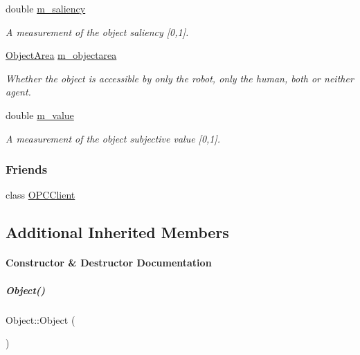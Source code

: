 \begin{DoxyCompactItemize}
double \hyperlink{group__icubclient__representations_a0d5e8b5dce9751c5439b50461a16782a}{m\+\_\+saliency}
\begin{DoxyCompactList}\small\item\em A measurement of the object saliency \mbox{[}0,1\mbox{]}. \end{DoxyCompactList}\item 
\hyperlink{namespaceicubclient_a582031d3e105cc59d614d15d30d22e65}{Object\+Area} \hyperlink{group__icubclient__representations_a762c490f385f69ba71c522d4eb9c1e9d}{m\+\_\+objectarea}
\begin{DoxyCompactList}\small\item\em Whether the object is accessible by only the robot, only the human, both or neither agent. \end{DoxyCompactList}\item 
double \hyperlink{group__icubclient__representations_a6d330b102ce154567c0532a345950f2a}{m\+\_\+value}
\begin{DoxyCompactList}\small\item\em A measurement of the object subjective value \mbox{[}0,1\mbox{]}. \end{DoxyCompactList}\end{DoxyCompactItemize}
\subsubsection*{Friends}
\begin{DoxyCompactItemize}
\item 
class \hyperlink{group__icubclient__representations_a80f0caa9925206967111a3d2713874a2}{O\+P\+C\+Client}
\end{DoxyCompactItemize}
\subsection*{Additional Inherited Members}


\paragraph{Constructor \& Destructor Documentation}
\mbox{\label{group__icubclient__representations_a40860402e64d8008fb42329df7097cdb}} 
\subparagraph{\texorpdfstring{Object()}{Object()}\hspace{0.1cm}{\footnotesize\ttfamily [1/2]}}
{\footnotesize\ttfamily Object\+::\+Object (\begin{DoxyParamCaption}{ }\end{DoxyParamCaption})}



